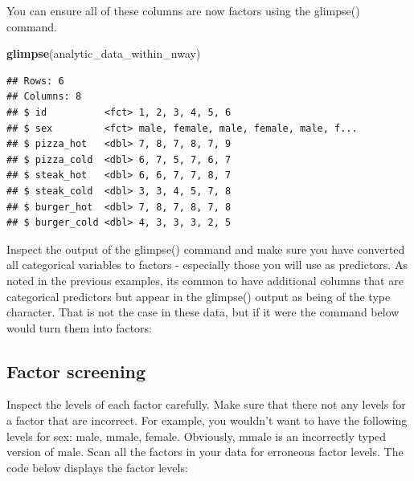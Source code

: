 \documentclass[
]{krantz}
\makeatletter
\newenvironment{Shaded}{\begin{snugshade}}{\end{snugshade}}
\newcommand{\DataTypeTok}[1]{\textcolor[rgb]{0.27,0.27,0.27}{#1}}
\newcommand{\KeywordTok}[1]{\textcolor[rgb]{0.27,0.27,0.27}{\textbf{#1}}}
\newcommand{\NormalTok}[1]{#1}
\newcommand{\OperatorTok}[1]{\textcolor[rgb]{0.43,0.43,0.43}{\textbf{#1}}}
\newcommand{\StringTok}[1]{\textcolor[rgb]{0.5,0.5,0.5}{#1}}
\newenvironment{kframe}{%
\medskip{}
\setlength{\fboxsep}{.8em}
 \def\at@end@of@kframe{}%
 \ifinner\ifhmode%
  \def\at@end@of@kframe{\end{minipage}}%
  \begin{minipage}{\columnwidth}%
 \fi\fi%
 \def\FrameCommand##1{\hskip\@totalleftmargin \hskip-\fboxsep
 \colorbox{shadecolor}{##1}\hskip-\fboxsep
     \hskip-\linewidth \hskip-\@totalleftmargin \hskip\columnwidth}%
 \MakeFramed {\advance\hsize-\width
   \@totalleftmargin\z@ \linewidth\hsize
   \@setminipage}}%
 {\par\unskip\endMakeFramed%
 \at@end@of@kframe}
\renewenvironment{Shaded}{\begin{kframe}}{\end{kframe}}
\makeatother
\begin{document}
You can ensure all of these columns are now factors using the glimpse() command.

\begin{Shaded}
\begin{Highlighting}[]
\KeywordTok{glimpse}\NormalTok{(analytic_data_within_nway)}
\end{Highlighting}
\end{Shaded}

\begin{verbatim}
## Rows: 6
## Columns: 8
## $ id          <fct> 1, 2, 3, 4, 5, 6
## $ sex         <fct> male, female, male, female, male, f...
## $ pizza_hot   <dbl> 7, 8, 7, 8, 7, 9
## $ pizza_cold  <dbl> 6, 7, 5, 7, 6, 7
## $ steak_hot   <dbl> 6, 6, 7, 7, 8, 7
## $ steak_cold  <dbl> 3, 3, 4, 5, 7, 8
## $ burger_hot  <dbl> 7, 8, 7, 8, 7, 8
## $ burger_cold <dbl> 4, 3, 3, 3, 2, 5
\end{verbatim}

Inspect the output of the glimpse() command and make sure you have converted all categorical variables to factors - especially those you will use as predictors. As noted in the previous examples, its common to have additional columns that are categorical predictors but appear in the glimpse() output as being of the type character. That is not the case in these data, but if it were the command below would turn them into factors:

\begin{Shaded}
\end{Shaded}

\hypertarget{factor-screening-2}{%
\subsection{Factor screening}\label{factor-screening-2}}

Inspect the levels of each factor carefully. Make sure that there not any levels for a factor that are incorrect. For example, you wouldn't want to have the following levels for sex: male, mmale, female. Obviously, mmale is an incorrectly typed version of male. Scan all the factors in your data for erroneous factor levels. The code below displays the factor levels:
\end{document}
